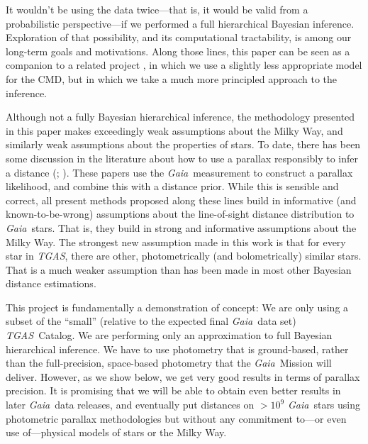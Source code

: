 \documentclass[modern]{aastex61}
\newcommand{\acronym}[1]{{\small{#1}}}
\newcommand{\project}[1]{\textsl{#1}}
\newcommand{\tgas}{\project{\acronym{TGAS}}}
\newcommand{\gaia}{\project{Gaia}}
\newcommand{\cmd}{\acronym{CMD}}
\begin{document}
It wouldn't be using the data twice---that is, it would be valid from a
probabilistic perspective---if we performed a full hierarchical Bayesian
inference.
Exploration of that possibility, and its computational tractability,
is among our long-term goals and motivations.
Along those lines, this paper can be seen as a companion to a related
project \citep{leistedtHogg2017}, in which we use a slightly less appropriate
model for the \cmd, but in which we take a much more principled
approach to the inference.

Although not a fully Bayesian hierarchical inference, the methodology presented in this paper makes exceedingly weak assumptions
about the Milky Way, and similarly weak assumptions about the properties of
stars.
To date, there has been some discussion in the literature
about how to use a parallax responsibly to infer a distance (\citealt{astraatmadja16a}; \citealt{astraatmadja16b}).
These papers use the \gaia\ measurement to construct a parallax likelihood,
and combine this with a distance prior.
While this is sensible and correct, all present methods proposed along
these lines build in informative (and known-to-be-wrong) assumptions
about the line-of-sight distance distribution to \gaia\ stars.
That is, they build in strong and informative assumptions about the Milky
Way.
The strongest new assumption made in this work is that for every star
in \tgas, there are other, photometrically (and bolometrically)
similar stars.
That is a much weaker assumption than has been made in most other Bayesian
distance estimations.

This project is fundamentally a demonstration of concept:
We are only using a subset of the ``small'' (relative to the expected final \gaia\ data set)
\tgas\ Catalog.
We are performing only an approximation to full Bayesian hierarchical inference.
We have to use photometry that is ground-based, rather than the full-precision,
space-based photometry that the \gaia\ Mission will deliver.
However, as we show below, we get very good results in terms of parallax precision.
It is promising that we will be able to obtain even better results
in later \gaia\ data releases, and eventually put distances on $>10^9$
\gaia\ stars using photometric parallax methodologies but without any
commitment to---or even use of---physical models of stars or the Milky Way.
\end{document}
